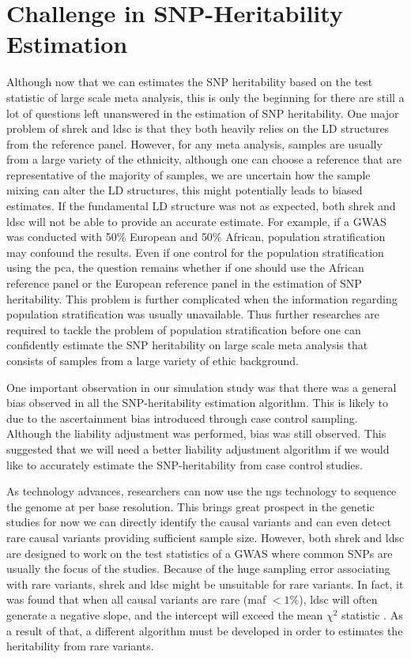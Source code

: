 \documentclass[12pt]{book}
\begin{document}
	\section{Challenge in SNP-Heritability Estimation}
	Although now that we can estimates the \gls{SNP} heritability based on the test statistic of large scale meta analysis, this is only the beginning for there are still a lot of questions left unanswered in the estimation of \gls{SNP} heritability.
	One major problem of \gls{shrek} and \gls{ldsc} is that they both heavily relies on the \gls{LD} structures from the reference panel.
	However, for any meta analysis, samples are usually from a large variety of the ethnicity, although one can choose a reference that are representative of the majority of samples, we are uncertain how the sample mixing can alter the \gls{LD} structures, this might potentially leads to biased estimates.
	If the fundamental \gls{LD} structure was not as expected, both \gls{shrek} and \gls{ldsc} will not be able to provide an accurate estimate. 
	For example, if a \gls{GWAS} was conducted with 50\% European and 50\% African, population stratification may confound the results.
	Even if one control for the population stratification using the \gls{pca}, the question remains whether if one should use the African reference panel or the European reference panel in the estimation of \gls{SNP} heritability.
	This problem is further complicated when the information regarding population stratification was usually unavailable. 
	Thus further researches are required to tackle the problem of population stratification before one can confidently estimate the \gls{SNP} heritability on large scale meta analysis that consists of samples from a large variety of ethic background.
	
	One important observation in our simulation study was that there was a general bias observed in all the \gls{SNP}-heritability estimation algorithm.
	This is likely to due to the ascertainment bias introduced through case control sampling.
	Although the liability adjustment was performed, bias was still observed. 
	This suggested that we will need a better liability adjustment algorithm if we would like to accurately estimate the \gls{SNP}-heritability from case control studies.
	
	As technology advances, researchers can now use the \gls{ngs} technology to sequence the genome at per base resolution. 
	This brings great prospect in the genetic studies for now we can directly identify the causal variants and can even detect rare causal variants providing sufficient sample size. 
	However, both \gls{shrek} and \gls{ldsc} are designed to work on the test statistics of a \gls{GWAS} where common \glspl{SNP} are usually the focus of the studies. 
	Because of the huge sampling error associating with rare variants, \gls{shrek} and \gls{ldsc} might be unsuitable for rare variants. 
	In fact, it was found that when all causal variants are rare (\gls{maf} $<1\%$), \gls{ldsc} will often generate a negative slope, and the intercept will exceed the mean $\chi^2$ statistic \citep{Bulik-Sullivan2015}.
	As a result of that, a different algorithm must be developed in order to estimates the heritability from rare variants.
	
\end{document}

